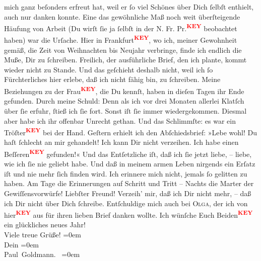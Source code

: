 \begin{ledgroupsized}[t]{13cm}
                    mich ganz beſonders erfreut hat, weil er ſo viel Schönes über Dich ſelbſt
                    enthielt, auch nur danken konnte. Eine das gewöhnliche Maß noch weit
                    überſteigende Häufung von Arbeit (Du wirſt ſie ja ſelbſt in der N. Fr. Pr.\textcolor{red}{\textsuperscript{\textbf{KEY}}} beobachtet haben) war die Urſache. Hier in Frankfurt\textcolor{red}{\textsuperscript{\textbf{KEY}}}, wo ich, meiner Gewohnheit gemäß, die
                    Zeit von Weihnachten bis Neujahr verbringe, finde ich
                    endlich die {\pb} Muße, Dir zu ſchreiben. Freilich,
                    der ausführliche Brief, den ich plante, kommt wieder nicht zu Stande. Und das
                    geſchieht deshalb nicht, weil ich ſo Fürchterliches hier erlebe, daß ich nicht
                    fähig bin, zu ſchreiben. Meine Beziehungen zu der Frau\textcolor{red}{\textsuperscript{\textbf{KEY}}}, die Du kennſt, haben in dieſen Tagen ihr Ende gefunden. Durch
                    meine Schuld: Denn als ich vor drei Monaten allerlei Klatſch über ſie erfuhr,
                    ſtieß ich ſie fort. Sonst iſt ſie immer wiedergekommen. Diesmal aber habe ich
                    ihr offenbar Unrecht gethan. Und das Schlimmſte: es war ein Tröſter\textcolor{red}{\textsuperscript{\textbf{KEY}}} bei der Hand. Geſtern erhielt ich den
                    Abſchiedsbrief: »Lebe wohl! Du haſt ſchlecht an mir gehandelt! Ich kann Dir
                    nicht verzeihen. Ich habe einen Beſſeren\textcolor{red}{\textsuperscript{\textbf{KEY}}}
                    gefunden!« \pend
           \pstart
           Und das Entſetzliche iſt, daß ich ſie jetzt liebe, – liebe, wie ich ſie nie
                    geliebt habe. Und daß in meinem armen Leben nirgends ein Erſatz iſt und nie mehr
                    ſich finden wird. Ich erinnere mich nicht, jemals ſo gelitten zu haben. Am Tage
                    die Erinnerungen auf Schritt und Tritt – Nachts die Marter {\pb} der Gewiſſensvorwürfe! \pend
           \pstart
           Liebſter Freund! Verzeih’ mir, daß ich Dir nicht mehr, – daß ich Dir nicht
                    über Dich ſchreibe. Entſchuldige mich auch bei \textsc{Olga}, der ich von hier\textcolor{red}{\textsuperscript{\textbf{KEY}}} aus für ihren lieben Brief
                    danken wollte. Ich wünſche Euch Beiden\textcolor{red}{\textsuperscript{\textbf{KEY}}} ein
                    glückliches neues Jahr! {\\[\baselineskip]}Viele treue Grüße!\pend
           \leftskip=0em{}\pstart
           {\\[\baselineskip]}Dein\pend
           \leftskip=0em{}\pstart
           {\\[\baselineskip]}\spacefill\mbox{Paul Goldmann. }\pend
           \leftskip=0em{}
         
         \endnumbering{}\end{ledgroupsized}\begin{anhang}\end{anhang}\newcommand{\dateiname}{L03231}\newcommand{\titel}{Paul Goldmann an Arthur Schnitzler, 28. 12. [1902]}\newcommand{\editorInnen}{Martin Anton Müller und Laura Untner}
      